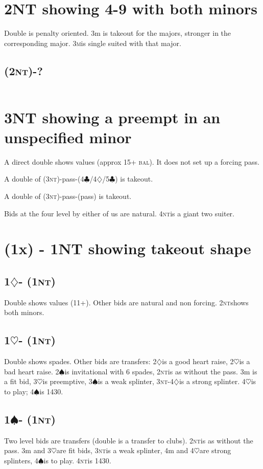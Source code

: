 \documentclass{article}
\newcommand{\bal}{\textsc{bal}}
\renewcommand{\c}{\ensuremath{\clubsuit}}
\renewcommand{\d}{\ensuremath{\diamondsuit}}
\newcommand{\h}{\ensuremath{\heartsuit}}
\newcommand{\s}{\ensuremath{\spadesuit}}
\newcommand{\nt}{\textsc{nt}}
\newcommand{\+}{\ensuremath{^+}}
\newcommand{\M}{\textsc{m}}
\begin{document}
\section{2NT showing 4-9 with both minors}

Double is penalty oriented.  3m is takeout for the majors, stronger in the corresponding major.  3\M is single suited with that major.
\subsection{(2\nt)-?}
\begin{tabular}{llllll}

\end{tabular}

\section{3NT showing a preempt in an unspecified minor}
A direct double shows values (approx 15+ \bal).  It does not set up a forcing pass.

A double of (3\nt)-pass-(4\c/4\d/5\c) is takeout.

A double of (3\nt)-pass-(pass) is takeout.

Bids at the four level by either of us are natural. 4\nt is a giant two suiter.

\section{(1x) - 1NT showing takeout shape}

\subsection{1\d - (1\nt)}
Double shows values (11+).  Other bids are natural and non forcing.  2\nt shows both minors.

\subsection{1\h - (1\nt)}
Double shows spades.  Other bids are transfers: 2\d is a good heart raise, 2\h is a bad heart raise.  2\s is invitational with 6 spades, 2\nt is as without the pass.  3m is a fit bid, 3\h is preemptive, 3\s is a weak splinter, 3\nt-4\d is a strong splinter.  4\h is to play; 4\s is 1430.

\subsection{1\s - (1\nt)}
Two level bids are transfers (double is a transfer to clubs).  2\nt is as without the pass.  3m and 3\h are fit bids, 3\nt is a weak splinter, 4m and 4\h are strong splinters, 4\s is to play.  4\nt is 1430.
\end{document}
